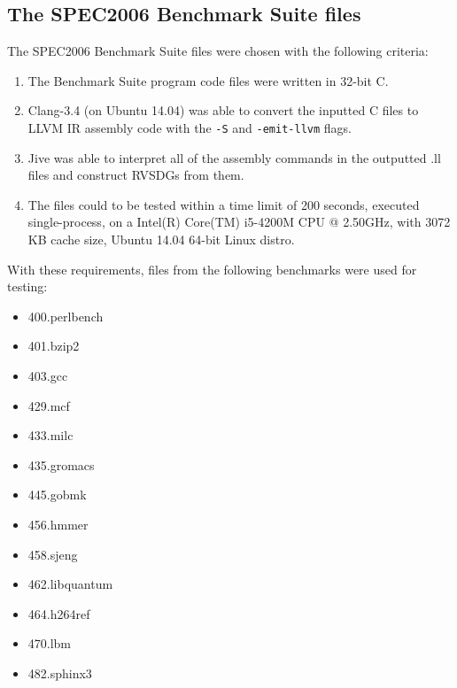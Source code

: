 \subsection{The SPEC2006 Benchmark Suite files}
\label{sub:meth:SPEC2006_files}

The SPEC2006 Benchmark Suite files were chosen with the following criteria:

\begin{enumerate}
	\item The Benchmark Suite program code files were written in 32-bit C.

	\item Clang-3.4 (on Ubuntu 14.04) was able to convert the inputted C files
to LLVM IR assembly code with the \lstinline!-S! and \lstinline!-emit-llvm!
flags.

	\item Jive was able to interpret all of the assembly commands in the
outputted .ll files and construct RVSDGs from them.

	\item The files could to be tested within a time limit of 200 seconds,
executed single-process, on a Intel(R) Core(TM) i5-4200M CPU @ 2.50GHz, with
3072 KB cache size, Ubuntu 14.04 64-bit Linux distro.
\end{enumerate}


With these requirements, files from the following benchmarks were used for
testing:

\begin{multicols}{3}
	\begin{itemize}
		\item 400.perlbench
		\item 401.bzip2
		\item 403.gcc
		\item 429.mcf
		\item 433.milc
		\item 435.gromacs
		\item 445.gobmk
		\item 456.hmmer
		\item 458.sjeng
		\item 462.libquantum
		\item 464.h264ref
		\item 470.lbm
		\item 482.sphinx3
	\end{itemize}
\end{multicols}

